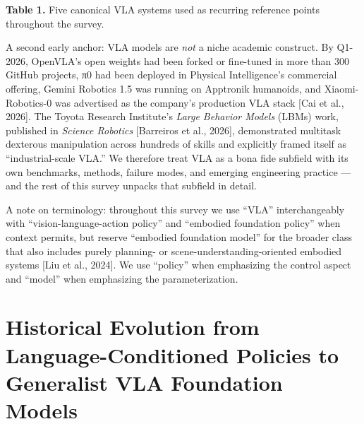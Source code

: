 \textbf{Table 1.} Five canonical VLA systems used as recurring reference points throughout the survey.

A second early anchor: VLA models are \emph{not} a niche academic construct. By Q1-2026, OpenVLA's open weights had been forked or fine-tuned in more than 300 GitHub projects, π0 had been deployed in Physical Intelligence's commercial offering, Gemini Robotics 1.5 was running on Apptronik humanoids, and Xiaomi-Robotics-0 was advertised as the company's production VLA stack {[}Cai et al., 2026{]}. The Toyota Research Institute's \emph{Large Behavior Models} (LBMs) work, published in \emph{Science Robotics} {[}Barreiros et al., 2026{]}, demonstrated multitask dexterous manipulation across hundreds of skills and explicitly framed itself as ``industrial-scale VLA.'' We therefore treat VLA as a bona fide subfield with its own benchmarks, methods, failure modes, and emerging engineering practice --- and the rest of this survey unpacks that subfield in detail.

A note on terminology: throughout this survey we use ``VLA'' interchangeably with ``vision-language-action policy'' and ``embodied foundation policy'' when context permits, but reserve ``embodied foundation model'' for the broader class that also includes purely planning- or scene-understanding-oriented embodied systems {[}Liu et al., 2024{]}. We use ``policy'' when emphasizing the control aspect and ``model'' when emphasizing the parameterization.

\section{Historical Evolution from Language-Conditioned Policies to Generalist VLA Foundation Models}\label{historical-evolution-from-language-conditioned-policies-to-generalist-vla-foundation-models}

